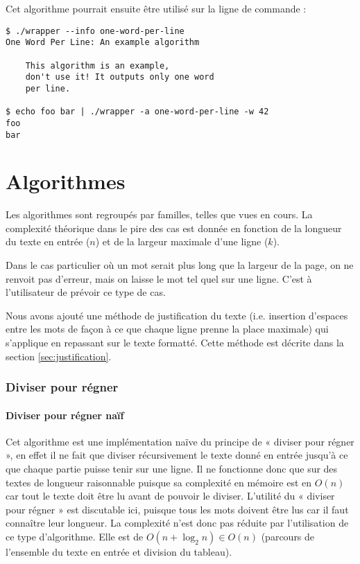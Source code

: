 \documentclass[a4paper, 11pt]{article}
\begin{document}
Cet algorithme pourrait ensuite être utilisé sur la ligne de commande :

\begin{verbatim}
$ ./wrapper --info one-word-per-line
One Word Per Line: An example algorithm

    This algorithm is an example,
    don't use it! It outputs only one word
    per line.

$ echo foo bar | ./wrapper -a one-word-per-line -w 42
foo
bar
\end{verbatim}

\part{Algorithmes}

Les algorithmes sont regroupés par familles, telles que vues en cours.
La complexité théorique dans le pire des cas est donnée en fonction de la
longueur du texte en entrée ($n$) et de la largeur maximale d'une ligne ($k$).

Dans le cas particulier où un mot serait plus long que la largeur de la page, on
ne renvoit pas d'erreur, mais on laisse le mot tel quel sur une ligne. C'est à
l'utilisateur de prévoir ce type de cas.

Nous avons ajouté une méthode de justification du texte (i.e. insertion
d'espaces entre les mots de façon à ce que chaque ligne prenne la place
maximale) qui s'applique en repassant sur le texte formatté. Cette méthode est
décrite dans la section \ref{sec:justification}.

\section{Diviser pour régner}

\subsection{Diviser pour régner naïf}

Cet algorithme est une implémentation naïve du principe de « diviser pour régner
», en effet il ne fait que diviser récursivement le texte donné en entrée
jusqu'à ce que chaque partie puisse tenir sur une ligne. Il ne fonctionne donc
que sur des textes de longueur raisonnable puisque sa complexité en mémoire est
en $O(n)$ car tout le texte doit être lu avant de pouvoir le diviser. L'utilité
du « diviser pour régner » est discutable ici, puisque tous les mots doivent
être lus car il faut connaître leur longueur. La complexité n'est donc pas
réduite par l'utilisation de ce type d'algorithme. Elle est de
$O(n+\log_2 n) \in O(n)$ (parcours de l'ensemble du texte en entrée et division
du tableau).
\end{document}
